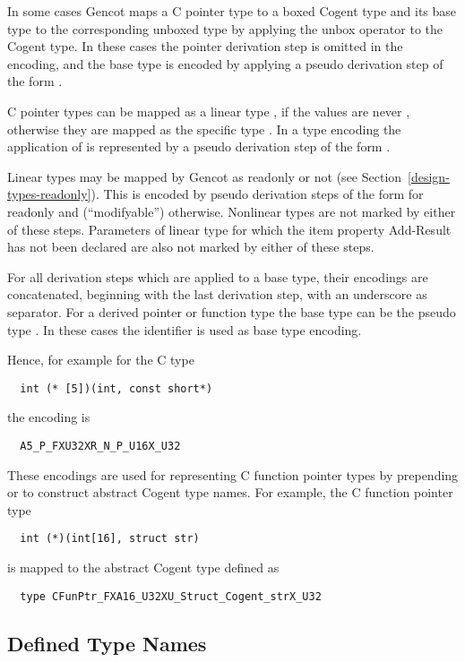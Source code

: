 In some cases Gencot maps a C pointer type to a boxed Cogent type and its base type to the corresponding
unboxed type by applying the unbox operator \code{\#} to the Cogent type. In these cases the pointer derivation
step is omitted in the encoding, and the base type is encoded by applying a pseudo derivation step 
of the form .

C pointer types can be mapped as a linear type , if the values are never , otherwise they are mapped
as the specific type . In a type encoding the application of  is represented by
a pseudo derivation step of the form .

Linear types may be mapped by Gencot as readonly or not (see Section~\ref{design-types-readonly}). 
This is encoded by pseudo derivation steps of the form  for readonly and  (``modifyable'')
otherwise. Nonlinear types are not marked by either of these steps. Parameters of linear type for 
which the item property Add-Result has not been declared are also not
marked by either of these steps.

For all derivation steps which are applied to a base type, their encodings are concatenated, beginning with the 
last derivation step, with an underscore \code{\_} as separator. For a derived pointer or 
function type the base type can be the pseudo type . In these cases the identifier  is
used as base type encoding.

Hence, for example for the C type
\begin{verbatim}
  int (* [5])(int, const short*)
\end{verbatim}
the encoding is
\begin{verbatim}
  A5_P_FXU32XR_N_P_U16X_U32
\end{verbatim}

These encodings are used for representing C function pointer types by prepending  or 
to construct abstract Cogent type names. For example, the C function pointer type
\begin{verbatim}
  int (*)(int[16], struct str)
\end{verbatim}
is mapped to the abstract Cogent type defined as
\begin{verbatim}
  type CFunPtr_FXA16_U32XU_Struct_Cogent_strX_U32
\end{verbatim}

\subsection{Defined Type Names}
\label{design-types-typedef}

